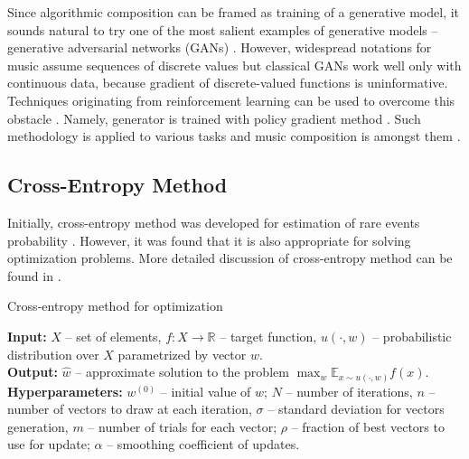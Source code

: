 \documentclass{article}
\begin{document}
Since algorithmic composition can be framed as training of a generative model, it sounds natural to try one of the most salient examples of generative models -- generative adversarial networks (GANs) \cite{goodfellow2014gan}. However, widespread notations for music assume sequences of discrete values but classical GANs work well only with continuous data, because gradient of discrete-valued functions is uninformative. Techniques originating from reinforcement learning can be used to overcome this obstacle \cite{yu2016seqgan,hjelm2017boundary}. Namely, generator is trained with policy gradient method \cite{williams1992simple}. Such methodology is applied to various tasks and music composition is amongst them \cite{limaguimaraes2017objective}.

\subsection{Cross-Entropy Method}
\label{subsec:crossentropy}

Initially, cross-entropy method was developed for estimation of rare events probability \cite{rubinstein1997optimization}. However, it was found that it is also appropriate for solving optimization problems. More detailed discussion of cross-entropy method can be found in \cite{boer2005tutorial}.

\begin{algorithm}
	\caption{Cross-entropy method for optimization} \label{alg:crossentropy}
	\textbf{Input:} $X$ -- set of elements, $f: X \to \mathbb{R}$ -- target function, $u(\cdot, w)$ -- probabilistic distribution over $X$ parametrized by vector $w$. \\
	\textbf{Output:} $\hat{w}$ -- approximate solution to the problem $\max_w \mathbb{E}_{x \sim u(\cdot, w)} f(x)$. \\
	\textbf{Hyperparameters:} $w^{(0)}$ -- initial value of $w$; $N$ -- number of iterations, $n$ -- number of vectors to draw at each iteration, $\sigma$ -- standard deviation for vectors generation, $m$ -- number of trials for each vector; $\rho$ -- fraction of best vectors to use for update; $\alpha$ -- smoothing coefficient of updates.
	\begin{algorithmic}[1]
		    \ENDFOR
		\ENDFOR
	\end{algorithmic}
\end{algorithm}
\end{document}
